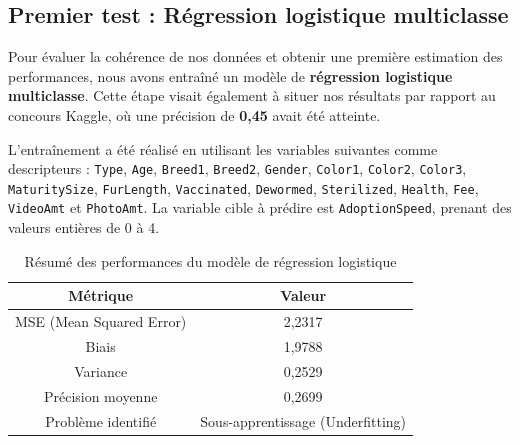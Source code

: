 \documentclass[a4paper,12pt]{article}
\begin{document}
\subsection{Premier test : Régression logistique multiclasse}

Pour évaluer la cohérence de nos données et obtenir une première estimation des performances, nous avons entraîné un modèle de \textbf{régression logistique multiclasse}. Cette étape visait également à situer nos résultats par rapport au concours Kaggle, où une précision de \textbf{0{,}45} avait été atteinte.

L'entraînement a été réalisé en utilisant les variables suivantes comme descripteurs : \texttt{Type}, \texttt{Age}, \texttt{Breed1}, \texttt{Breed2}, \texttt{Gender}, \texttt{Color1}, \texttt{Color2}, \texttt{Color3}, \texttt{MaturitySize}, \texttt{FurLength}, \texttt{Vaccinated}, \texttt{Dewormed}, \texttt{Sterilized}, \texttt{Health}, \texttt{Fee}, \texttt{VideoAmt} et \texttt{PhotoAmt}. La variable cible à prédire est \texttt{AdoptionSpeed}, prenant des valeurs entières de 0 à 4.

\begin{table}[ht]

    \centering

    \begin{tabular}{|c|c|}

        \hline

        \textbf{Métrique}        & \textbf{Valeur}                   \\ \hline

        MSE (Mean Squared Error) & 2,2317                            \\ \hline

        Biais                    & 1,9788                            \\ \hline

        Variance                 & 0,2529                            \\ \hline

        Précision moyenne        & 0,2699                            \\ \hline

        Problème identifié       & Sous-apprentissage (Underfitting) \\ \hline
    \end{tabular}

    \caption{Résumé des performances du modèle de régression logistique}

\end{table}
\end{document}
